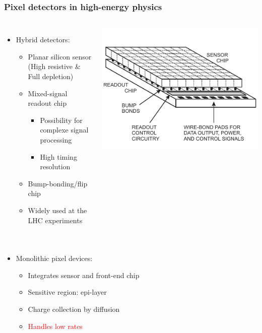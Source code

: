 \begin{frame}
  \frametitle{Pixel detectors in high-energy physics}

  \begin{columns}
    \begin{itemize}
    \item Hybrid detectors:
      \begin{itemize}
      \item Planar silicon sensor (High resistive \& Full depletion)
      \item Mixed-signal readout chip
        \begin{itemize}
        \item Possibility for complexe signal processing
        \item High timing resolution
        \end{itemize}
      \item Bump-bonding/flip chip
      \item Widely used at the LHC experiments
      \end{itemize}
    \end{itemize}

    \centering
    \includegraphics[width=\textwidth]{figures/hybridDet.pdf}
  \end{columns}

  \vspace{-0.1cm}
  \begin{columns}
    \begin{itemize}
    \item Monolithic pixel devices:
      \begin{itemize}
      \item Integrates sensor and front-end chip
      \item Sensitive region: epi-layer
      \item Charge collection by diffusion
      \item \textcolor{Red}{Handles low rates}
      \end{itemize}
    \end{itemize}


\end{columns}
\end{frame}
